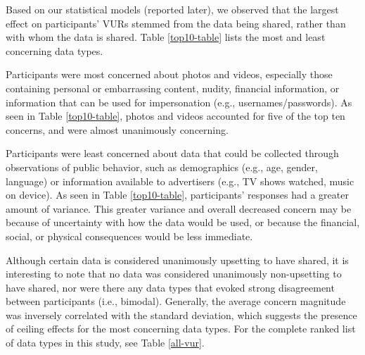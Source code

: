 \documentclass[conference]{IEEEtran}
\begin{document}
Based on our statistical models (reported later), we observed that the largest effect on participants' VURs stemmed from the data being shared, rather than with whom the data is shared. Table \ref{top10-table} lists the most and least concerning data types. 

Participants were most concerned about photos and videos, especially those containing personal or embarrassing content, nudity, financial information, or information that can be used for impersonation (e.g., usernames/passwords). As seen in Table \ref{top10-table}, photos and videos accounted for five of the top ten concerns, and were almost unanimously concerning. 

Participants were least concerned about data that could be collected through observations of public behavior, such as demographics (e.g., age, gender, language) or information available to advertisers (e.g., TV shows watched, music on device). As seen in Table \ref{top10-table}, participants' responses had a greater amount of variance.  This greater variance and overall decreased concern may be because of uncertainty with how the data would be used, or because the financial, social, or physical consequences would be less immediate.

Although certain data is considered unanimously upsetting to have shared, it is interesting to note that no data was considered unanimously non-upsetting to have shared, nor were there any data types that evoked strong disagreement between participants (i.e., bimodal). Generally, the average concern magnitude was inversely correlated with the standard deviation, which suggests the presence of ceiling effects for the most concerning data types. For the complete ranked list of data types in this study, see Table \ref{all-vur}.
\end{document}
